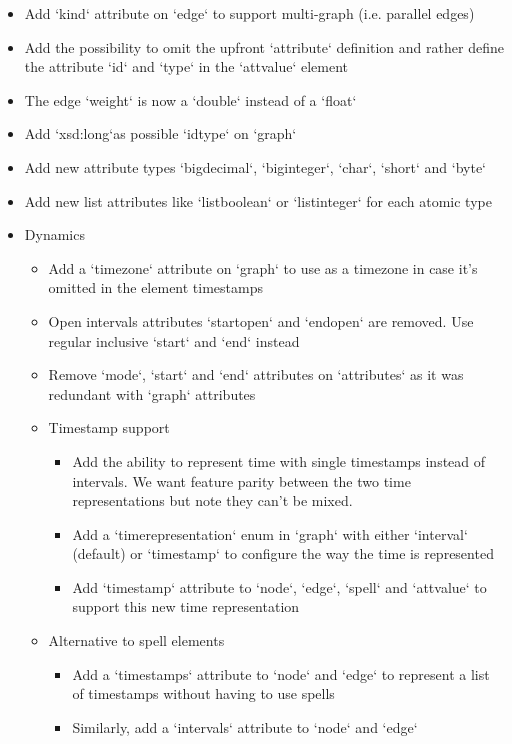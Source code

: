 \documentclass[a4paper,10pt]{article}
\begin{document}
\begin{itemize}
\item Add `kind` attribute on `edge` to support multi-graph (i.e. parallel edges)
\item Add the possibility to omit the upfront `\<attribute`\> definition and rather define the attribute `id` and `type` in the `\<attvalue\>` element
\item The edge `weight` is now a `double` instead of a `float`
\item Add `xsd:long`as possible `idtype` on `\<graph\>`
\item Add new attribute types `bigdecimal`, `biginteger`, `char`, `short` and `byte`
\item Add new list attributes like `listboolean` or `listinteger` for each atomic type
\item Dynamics
\begin{itemize}
\item Add a `timezone` attribute on `\<graph\>` to use as a timezone in case it's omitted in the element timestamps
\item Open intervals attributes `startopen` and `endopen` are removed. Use regular inclusive `start` and `end` instead
\item Remove `mode`, `start` and `end` attributes on `\<attributes\>` as it was redundant with `\<graph\>` attributes
\item Timestamp support
\begin{itemize}
\item Add the ability to represent time with single timestamps instead of intervals. We want feature parity between the two time representations but note they can't be mixed.
\item Add a `timerepresentation` enum in `\<graph\>` with either `interval` (default) or `timestamp` to configure the way the time is represented
\item Add `timestamp` attribute to `\<node\>`, `\<edge\>`, `\<spell\>` and `\<attvalue\>` to support this new time representation
\end{itemize}
\item Alternative to spell elements
\begin{itemize}
\item Add a `timestamps` attribute to `\<node\>` and `\<edge\>` to represent a list of timestamps without having to use spells
\item Similarly, add a `intervals` attribute to `\<node\>` and `\<edge\>`
\end{itemize}

\end{itemize}
\end{itemize}
\end{document}
